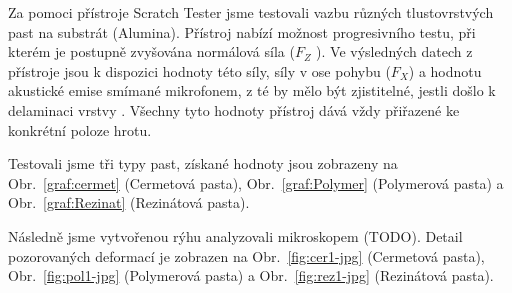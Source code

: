 Za pomoci přístroje Scratch Tester jsme testovali vazbu různých tlustovrstvých past na substrát (Alumina). Přístroj nabízí možnost progresivního testu, při kterém je postupně zvyšována normálová síla (\(F_{Z} \) ). Ve výsledných datech z přístroje jsou k dispozici hodnoty této síly, síly v ose pohybu (\(F_{X} \)) a hodnotu akustické emise smímané mikrofonem, z té by mělo být zjistitelné, jestli došlo k delaminaci vrstvy \cite{DiplomkaScratchTester}. Všechny tyto hodnoty přístroj dává vždy přiřazené ke konkrétní poloze hrotu. 

Testovali jsme tři typy past, získané hodnoty jsou zobrazeny na Obr.~\ref{graf:cermet} (Cermetová pasta), Obr.~\ref{graf:Polymer} (Polymerová pasta) a Obr.~\ref{graf:Rezinat} (Rezinátová pasta).

Následně jsme vytvořenou rýhu analyzovali mikroskopem (TODO). Detail pozorovaných deformací je zobrazen na Obr.~\ref{fig:cer1-jpg} (Cermetová pasta), Obr.~\ref{fig:pol1-jpg} (Polymerová pasta) a Obr.~\ref{fig:rez1-jpg} (Rezinátová pasta).

\begin{figure*}[h!]
    \caption{Scratch test -- Cermet.}
    \label{graf:cermet}
\end{figure*}

